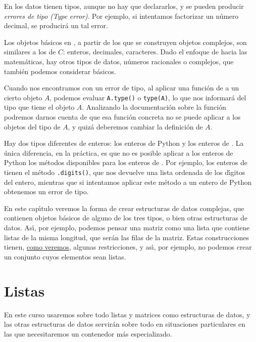 En {\sage} los datos tienen tipos, aunque no hay que declararlos, y se pueden
producir {\itshape errores de tipo (Type error)}. Por ejemplo, si intentamos
factorizar un n\'umero decimal, se producir\'a un tal error.  





Los objetos b\'asicos en {\sage}, a partir de los que se construyen objetos
complejos, son similares a los de $C$: enteros, decimales, caracteres. Dado el
enfoque de {\sage} hacia las matem\'aticas, hay otros tipos de datos, n\'umeros
racionales o complejos, que tambi\'en podemos considerar b\'asicos.

Cuando nos encontramos con un error de tipo, al aplicar una funci\'on de
{\sage} a un cierto objeto $A$, podemos evaluar \lstinline|A.type()| o
\lstinline|type(A)|, lo que nos informar\'a del tipo que tiene el objeto $A$.
Analizando la documentaci\'on sobre la funci\'on podremos darnos cuenta de que
esa funci\'on concreta no se puede aplicar a los objetos del tipo de $A$, y
quiz\'a deberemos cambiar la definici\'on de $A$. 

\label{enteros}

Hay dos tipos diferentes de enteros: los enteros de Python y los enteros de
{\sage}. La \'unica diferencia, en la pr\'actica,  es que no es posible aplicar
a los enteros de Python los m\'etodos disponibles para los enteros de {\sage}.
Por ejemplo, los enteros de {\sage} tienen el m\'etodo \lstinline|.digits()|,
que nos devuelve una lista ordenada de los d\'{\i}gitos del entero, mientras que
si intentamos aplicar este m\'etodo a un entero de Python obtenemos un error de
tipo.  

En este
cap\'{\i}tulo veremos la forma de crear estructuras de datos complejas, que
contienen objetos b\'asicos de alguno de los tres tipos, o bien otras
estructuras de datos.  As\'{\i}, por ejemplo, podemos pensar una matriz como
una lista que contiene listas de la misma longitud,  que ser\'an las filas de la
matriz. Estas construcciones tienen, \hyperref[unhash]{como veremos}, algunas
restricciones, y as\'{\i}, por ejemplo, no podemos crear un conjunto cuyos
elementos sean listas. 




\section{Listas}

En este curso {\sc usaremos sobre todo listas y matrices} como estructuras de
datos, y las otras estructuras de datos servir\'an sobre todo en situaciones
particulares en las que necesitaremos un contenedor m\'as especializado.


